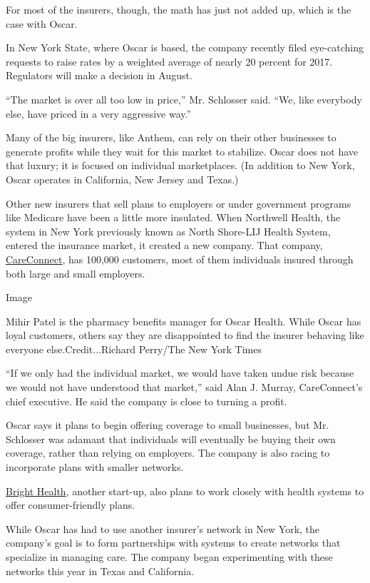 For most of the insurers, though, the math has just not added up, which
is the case with Oscar.

In New York State, where Oscar is based, the company recently filed
eye-catching requests to raise rates by a weighted average of nearly 20
percent for 2017. Regulators will make a decision in August.

``The market is over all too low in price,'' Mr. Schlosser said. ``We,
like everybody else, have priced in a very aggressive way.''

Many of the big insurers, like Anthem, can rely on their other
businesses to generate profits while they wait for this market to
stabilize. Oscar does not have that luxury; it is focused on individual
marketplaces. (In addition to New York, Oscar operates in California,
New Jersey and Texas.)

Other new insurers that sell plans to employers or under government
programs like Medicare have been a little more insulated. When Northwell
Health, the system in New York previously known as North Shore-LIJ
Health System, entered the insurance market, it created a new company.
That company, \href{https://www.careconnect.com/}{CareConnect}, has
100,000 customers, most of them individuals insured through both large
and small employers.

Image

Mihir Patel is the pharmacy benefits manager for Oscar Health. While
Oscar has loyal customers, others say they are disappointed to find the
insurer behaving like everyone else.Credit...Richard Perry/The New York
Times

``If we only had the individual market, we would have taken undue risk
because we would not have understood that market,'' said Alan J. Murray,
CareConnect's chief executive. He said the company is close to turning a
profit.

Oscar says it plans to begin offering coverage to small businesses, but
Mr. Schlosser was adamant that individuals will eventually be buying
their own coverage, rather than relying on employers. The company is
also racing to incorporate plans with smaller networks.

\href{http://brighthealthplan.com/\#welcome-to-bright-health}{Bright
Health}, another start-up, also plans to work closely with health
systems to offer consumer-friendly plans.

While Oscar has had to use another insurer's network in New York, the
company's goal is to form partnerships with systems to create networks
that specialize in managing care. The company began experimenting with
these networks this year in Texas and California.

